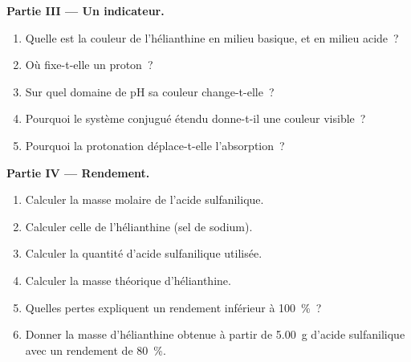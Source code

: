 \begin{problem}
\medskip
\noindent\textbf{Partie III --- Un indicateur.}
\begin{enumerate}[resume]
  \item Quelle est la couleur de l'hélianthine en milieu basique, et en milieu acide~?
  \item Où fixe-t-elle un proton~?
  \item Sur quel domaine de pH sa couleur change-t-elle~?
  \item Pourquoi le système conjugué étendu donne-t-il une couleur visible~?
  \item Pourquoi la protonation déplace-t-elle l'absorption~?
\end{enumerate}

\medskip
\noindent\textbf{Partie IV --- Rendement.}
\begin{enumerate}[resume]
  \item Calculer la masse molaire de l'acide sulfanilique.
  \item Calculer celle de l'hélianthine (sel de sodium).
  \item Calculer la quantité d'acide sulfanilique utilisée.
  \item Calculer la masse théorique d'hélianthine.
  \item Quelles pertes expliquent un rendement inférieur à 100~\%~?
  \item Donner la masse d'hélianthine obtenue à partir de \qty{5.00}{g} d'acide sulfanilique avec
        un rendement de 80~\%.
\end{enumerate}
\end{problem}
